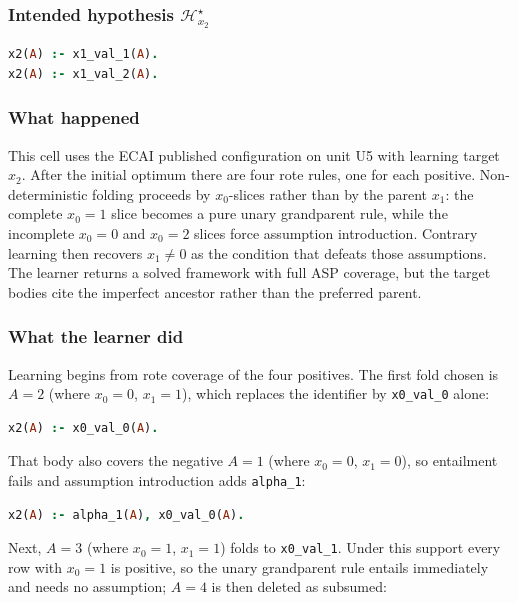 \documentclass[11pt]{article}
\begin{document}
\subsubsection{\texorpdfstring{Intended hypothesis \(\mathcal{H}_{x_2}^\star\)}{Intended hypothesis H-star(x2)}}

\begin{lstlisting}[style=logic,language=Prolog]
x2(A) :- x1_val_1(A).
x2(A) :- x1_val_2(A).
\end{lstlisting}

\subsubsection{What happened}

This cell uses the ECAI published configuration on unit U5 with learning target \(x_2\). After the initial optimum there are four rote rules, one for each positive. Non-deterministic folding proceeds by \(x_0\)-slices rather than by the parent \(x_1\): the complete \(x_0=1\) slice becomes a pure unary grandparent rule, while the incomplete \(x_0=0\) and \(x_0=2\) slices force assumption introduction. Contrary learning then recovers \(x_1\neq 0\) as the condition that defeats those assumptions. The learner returns a solved framework with full ASP coverage, but the target bodies cite the imperfect ancestor rather than the preferred parent.

\subsubsection{What the learner did}

Learning begins from rote coverage of the four positives. The first fold chosen is \(A=2\) (where \(x_0=0\), \(x_1=1\)), which replaces the identifier by \texttt{x0\_val\_0} alone:

\begin{lstlisting}[style=logic,language=Prolog]
x2(A) :- x0_val_0(A).
\end{lstlisting}

That body also covers the negative \(A=1\) (where \(x_0=0\), \(x_1=0\)), so entailment fails and assumption introduction adds \texttt{alpha\_1}:

\begin{lstlisting}[style=logic,language=Prolog]
x2(A) :- alpha_1(A), x0_val_0(A).
\end{lstlisting}

Next, \(A=3\) (where \(x_0=1\), \(x_1=1\)) folds to \texttt{x0\_val\_1}. Under this support every row with \(x_0=1\) is positive, so the unary grandparent rule entails immediately and needs no assumption; \(A=4\) is then deleted as subsumed:
\end{document}
